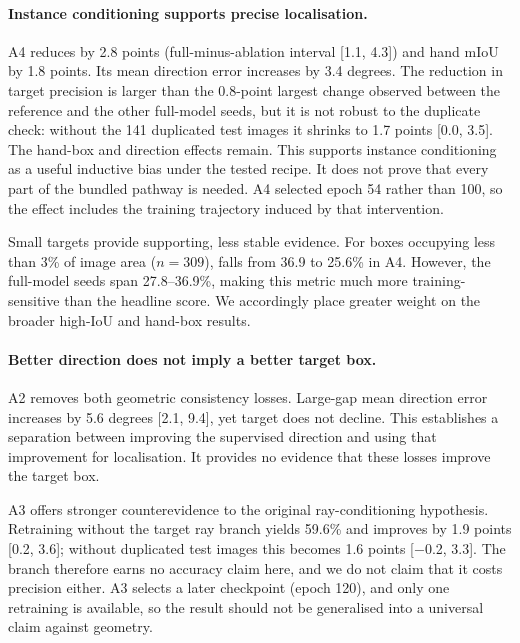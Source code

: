 \paragraph{Instance conditioning supports precise localisation.}
A4 reduces  by 2.8 points (full-minus-ablation interval [1.1, 4.3]) and hand mIoU by 1.8 points. Its mean direction error increases by 3.4 degrees. The reduction in target precision is larger than the 0.8-point largest  change observed between the reference and the other full-model seeds, but it is not robust to the duplicate check: without the 141 duplicated test images it shrinks to 1.7 points [0.0, 3.5]. The hand-box and direction effects remain. This supports instance conditioning as a useful inductive bias under the tested recipe. It does not prove that every part of the bundled pathway is needed. A4 selected epoch 54 rather than 100, so the effect includes the training trajectory induced by that intervention.

Small targets provide supporting, less stable evidence. For boxes occupying less than 3\% of image area ($n=309$),  falls from 36.9 to 25.6\% in A4. However, the full-model seeds span 27.8--36.9\%, making this metric much more training-sensitive than the headline score. We accordingly place greater weight on the broader high-IoU and hand-box results.

\paragraph{Better direction does not imply a better target box.}
A2 removes both geometric consistency losses. Large-gap mean direction error increases by 5.6 degrees [2.1, 9.4], yet target  does not decline. This establishes a separation between improving the supervised direction and using that improvement for localisation. It provides no evidence that these losses improve the target box.

A3 offers stronger counterevidence to the original ray-conditioning hypothesis. Retraining without the target ray branch yields 59.6\%  and improves  by 1.9 points [0.2, 3.6]; without duplicated test images this becomes 1.6 points [$-$0.2, 3.3]. The branch therefore earns no accuracy claim here, and we do not claim that it costs precision either. A3 selects a later checkpoint (epoch 120), and only one retraining is available, so the result should not be generalised into a universal claim against geometry.

